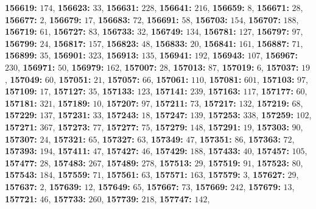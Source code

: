 \textsf{\bfseries 156619:} $174$, \textsf{\bfseries 156623:} $33$, \textsf{\bfseries 156631:} $228$, \textsf{\bfseries 156641:} $216$, \textsf{\bfseries 156659:} $8$, \textsf{\bfseries 156671:} $28$, \textsf{\bfseries 156677:} $2$, \textsf{\bfseries 156679:} $17$, \textsf{\bfseries 156683:} $72$, \textsf{\bfseries 156691:} $58$, \textsf{\bfseries 156703:} $154$, \textsf{\bfseries 156707:} $188$, \textsf{\bfseries 156719:} $61$, \textsf{\bfseries 156727:} $83$, \textsf{\bfseries 156733:} $32$, \textsf{\bfseries 156749:} $134$, \textsf{\bfseries 156781:} $127$, \textsf{\bfseries 156797:} $97$, \textsf{\bfseries 156799:} $24$, \textsf{\bfseries 156817:} $157$, \textsf{\bfseries 156823:} $48$, \textsf{\bfseries 156833:} $20$, \textsf{\bfseries 156841:} $161$, \textsf{\bfseries 156887:} $71$, \textsf{\bfseries 156899:} $35$, \textsf{\bfseries 156901:} $323$, \textsf{\bfseries 156913:} $135$, \textsf{\bfseries 156941:} $192$, \textsf{\bfseries 156943:} $107$, \textsf{\bfseries 156967:} $230$, \textsf{\bfseries 156971:} $50$, \textsf{\bfseries 156979:} $162$, \textsf{\bfseries 157007:} $28$, \textsf{\bfseries 157013:} $87$, \textsf{\bfseries 157019:} $6$, \textsf{\bfseries 157037:} $19$, \textsf{\bfseries 157049:} $60$, \textsf{\bfseries 157051:} $21$, \textsf{\bfseries 157057:} $66$, \textsf{\bfseries 157061:} $110$, \textsf{\bfseries 157081:} $601$, \textsf{\bfseries 157103:} $97$, \textsf{\bfseries 157109:} $17$, \textsf{\bfseries 157127:} $35$, \textsf{\bfseries 157133:} $123$, \textsf{\bfseries 157141:} $239$, \textsf{\bfseries 157163:} $117$, \textsf{\bfseries 157177:} $60$, \textsf{\bfseries 157181:} $321$, \textsf{\bfseries 157189:} $10$, \textsf{\bfseries 157207:} $97$, \textsf{\bfseries 157211:} $73$, \textsf{\bfseries 157217:} $132$, \textsf{\bfseries 157219:} $68$, \textsf{\bfseries 157229:} $137$, \textsf{\bfseries 157231:} $33$, \textsf{\bfseries 157243:} $18$, \textsf{\bfseries 157247:} $139$, \textsf{\bfseries 157253:} $338$, \textsf{\bfseries 157259:} $102$, \textsf{\bfseries 157271:} $367$, \textsf{\bfseries 157273:} $77$, \textsf{\bfseries 157277:} $75$, \textsf{\bfseries 157279:} $148$, \textsf{\bfseries 157291:} $19$, \textsf{\bfseries 157303:} $90$, \textsf{\bfseries 157307:} $24$, \textsf{\bfseries 157321:} $65$, \textsf{\bfseries 157327:} $63$, \textsf{\bfseries 157349:} $47$, \textsf{\bfseries 157351:} $86$, \textsf{\bfseries 157363:} $72$, \textsf{\bfseries 157393:} $194$, \textsf{\bfseries 157411:} $47$, \textsf{\bfseries 157427:} $46$, \textsf{\bfseries 157429:} $188$, \textsf{\bfseries 157433:} $40$, \textsf{\bfseries 157457:} $105$, \textsf{\bfseries 157477:} $28$, \textsf{\bfseries 157483:} $267$, \textsf{\bfseries 157489:} $278$, \textsf{\bfseries 157513:} $29$, \textsf{\bfseries 157519:} $91$, \textsf{\bfseries 157523:} $80$, \textsf{\bfseries 157543:} $184$, \textsf{\bfseries 157559:} $71$, \textsf{\bfseries 157561:} $63$, \textsf{\bfseries 157571:} $163$, \textsf{\bfseries 157579:} $3$, \textsf{\bfseries 157627:} $29$, \textsf{\bfseries 157637:} $2$, \textsf{\bfseries 157639:} $12$, \textsf{\bfseries 157649:} $65$, \textsf{\bfseries 157667:} $73$, \textsf{\bfseries 157669:} $242$, \textsf{\bfseries 157679:} $13$, \textsf{\bfseries 157721:} $46$, \textsf{\bfseries 157733:} $260$, \textsf{\bfseries 157739:} $218$, \textsf{\bfseries 157747:} $142$, 
